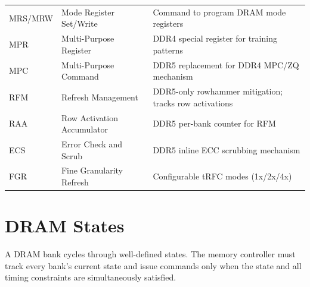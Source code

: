 \documentclass[11pt,a4paper]{article}
\begin{document}
\begin{longtable}{L{2.4cm} L{4.5cm} L{8cm}}
MRS/MRW & Mode Register Set/Write & Command to program DRAM mode registers \\
MPR  & Multi-Purpose Register & DDR4 special register for training patterns \\
MPC  & Multi-Purpose Command & DDR5 replacement for DDR4 MPC/ZQ mechanism \\
RFM  & Refresh Management & DDR5-only rowhammer mitigation; tracks row activations \\
RAA  & Row Activation Accumulator & DDR5 per-bank counter for RFM \\
ECS  & Error Check and Scrub & DDR5 inline ECC scrubbing mechanism \\
FGR  & Fine Granularity Refresh & Configurable tRFC modes (1x/2x/4x) \\
\end{longtable}

\section{DRAM States}

A DRAM bank cycles through well-defined states. The memory controller must track
every bank's current state and issue commands only when the state and all timing
constraints are simultaneously satisfied.
\end{document}
